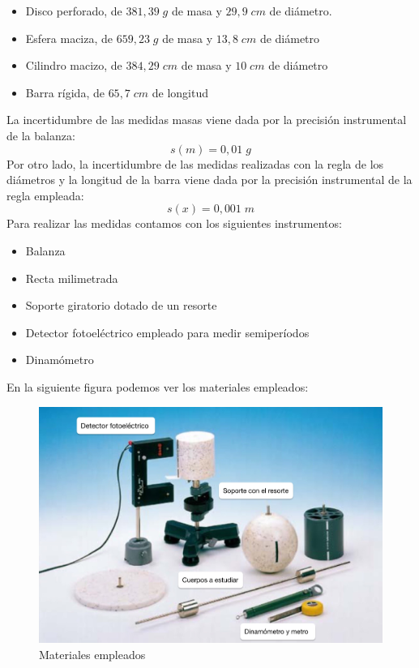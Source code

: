\documentclass[a4paper,12pt,titlepage]{article}
\begin{document}
\begin{itemize}
    \item Disco perforado, de $381,39 \;g$ de masa y $29,9 \; cm$ de diámetro.
    \item Esfera maciza, de $659,23 \; g$ de masa y $13,8 \; cm$ de diámetro
    \item Cilindro macizo, de $384,29 \; cm $ de masa y $10 \; cm$ de diámetro
    \item Barra rígida, de $65,7 \; cm$ de longitud
\end{itemize}
La incertidumbre de las medidas masas viene dada por la precisión instrumental de la balanza:
\begin{equation}
    s(m) = 0,01 \; g
\end{equation}
Por otro lado, la incertidumbre de las medidas realizadas con la regla de los diámetros y la longitud de la barra viene dada por la precisión instrumental de la regla empleada:
\begin{equation}
    s(x) = 0,001 \;m
\end{equation}
Para realizar las medidas contamos con los siguientes instrumentos:

\begin{itemize}
    \item Balanza
    \item Recta milimetrada
    \item Soporte giratorio dotado de un resorte
    \item Detector fotoeléctrico empleado para medir semiperíodos
    \item Dinamómetro
\end{itemize}

En la siguiente figura podemos ver los materiales empleados:

\begin{figure}[h!]
    \centering
    \includegraphics[width=0.75\linewidth]{Images/Material MI-1.jpg}
    \caption{Materiales empleados}
\end{figure}
\end{document}
